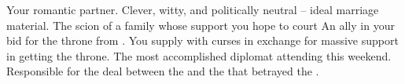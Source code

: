 \documentclass[char]{GL2020}
\begin{document}
\begin{itemz}[Notes]
	\item 
\end{itemz}

\begin{contacts}
	\contact{\cPirate{}} Your romantic partner. Clever, witty, and politically neutral -- ideal marriage material.
	\contact{\cAdopted{}} The scion of a family whose support you hope to court
	\contact{\cAntiChup{}} An ally in your bid for the throne from \pTech{}. You supply \cAntiChup{\them} with curses in exchange for massive support in getting the throne.
	\contact{\cDiplomat{}} The most accomplished diplomat attending this weekend. Responsible for the deal between the \pFarm{} and the \pTech{} that betrayed the \pShip{}.
\end{contacts}
\end{document}
